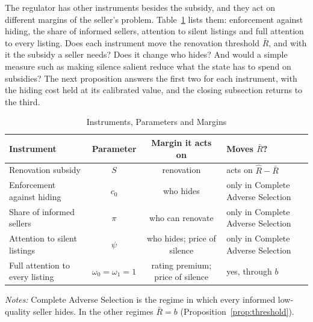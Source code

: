 \documentclass[10pt,letterpaper]{bp-template-concise}
\begin{document}
The regulator has other instruments besides the subsidy, and they act on different margins of the seller's problem. Table~\ref{tab:instruments} lists them: enforcement against hiding, the share of informed sellers, attention to silent listings and full attention to every listing. Does each instrument move the renovation threshold $\bar R$, and with it the subsidy a seller needs? Does it change who hides? And would a simple measure such as making silence salient reduce what the state has to spend on subsidies? The next proposition answers the first two for each instrument, with the hiding cost held at its calibrated value, and the closing subsection returns to the third.

\begin{table}[htbp]
\centering
\caption{Instruments, Parameters and Margins}
\label{tab:instruments}
\footnotesize\renewcommand{\arraystretch}{1.3}
\begin{tabular*}{\textwidth}{@{\extracolsep{\fill}}lccl@{}}
\toprule\toprule
\textbf{Instrument} & \textbf{Parameter} & \textbf{Margin it acts on} & \textbf{Moves $\bar R$?} \\
\midrule
Renovation subsidy & $S$ & renovation & acts on $\hat R-\bar R$ \\
Enforcement against hiding & $c_0$ & who hides & only in Complete Adverse Selection \\
Share of informed sellers & $\pi$ & who can renovate & only in Complete Adverse Selection \\
Attention to silent listings & $\psi$ & who hides; price of silence & only in Complete Adverse Selection \\
Full attention to every listing & $\omega_0=\omega_1=1$ & rating premium; price of silence & yes, through $b$ \\
\bottomrule\bottomrule
\end{tabular*}
\vspace{0.5em}

\raggedright
\footnotesize
\textit{Notes:} Complete Adverse Selection is the regime in which every informed low-quality seller hides. In the other regimes $\bar R=b$ (Proposition~\ref{prop:threshold}).
\end{table}
\end{document}
